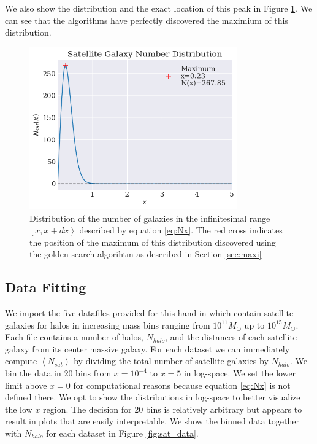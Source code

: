 

We also show the distribution and the exact location of this peak in Figure \ref{fig:maximum}. We can see that the algorithms have perfectly discovered the maximium of this distribution.

\begin{figure}
    \centering
    \includegraphics[width=0.8\textwidth]{results/maxi.png}
    \caption{Distribution of the number of galaxies in the infinitesimal range $\left[x, x+dx\right>$ described by equation \ref{eq:Nx}. The red cross indicates the position of the maximum of this distribution discovered using the golden search algorihtm as described in Section \ref{sec:maxi}}
    \label{fig:maximum}
\end{figure}




\subsection{Data Fitting}\label{sec:datafitting}

We import the five datafiles provided for this hand-in which contain satellite galaxies for halos in increasing mass bins ranging from $10^{11} M_{\odot}$ up to $10^{15} M_{\odot}$. Each file contains a number of halos, $N_{halo}$, and the distances of each satellite galaxy from its center massive galaxy. For each dataset we can immediately compute $\left<N_{sat}\right>$ by dividing the total number of satellite galaxies by $N_{halo}$. We bin the data in 20 bins from $x = 10^{-4}$ to $x=5$ in log-space. We set the lower limit above $x=0$ for computational reasons because equation \ref{eq:Nx} is not defined there. We opt to show the distributions in log-space to better visualize the low $x$ region. The decision for 20 bins is relatively arbitrary but appears to result in plots that are easily interpretable. We show the binned data together with $N_{halo}$ for each dataset in Figure \ref{fig:sat_data}.

